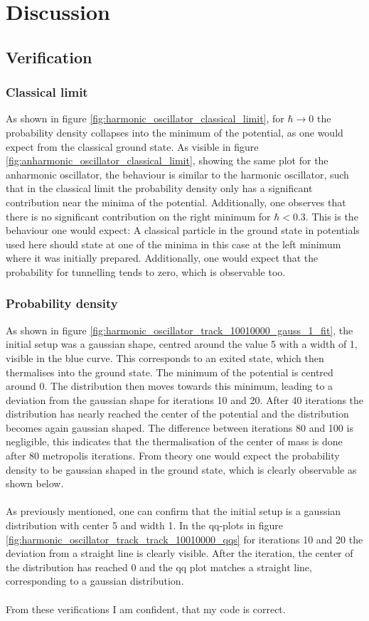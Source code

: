 \documentclass{scrartcl}
\begin{document}
	\section{Discussion}
	\subsection{Verification}
	\subsubsection{Classical limit}
		As shown in figure \ref{fig:harmonic_oscillator_classical_limit}, for $\hbar \rightarrow 0$ the probability density collapses into the minimum of the potential, as one would expect from the classical ground state.
		As visible in figure \ref{fig:anharmonic_oscillator_classical_limit}, showing the same plot for the anharmonic oscillator, the behaviour is similar to the harmonic oscillator, such that in the classical limit the probability density only has a significant contribution near the minima of the potential.
		Additionally, one observes that there is no significant contribution on the right minimum for $\hbar < 0.3$.
		This is the behaviour one would expect:
		A classical particle in the ground state in potentials used here should state at one of the minima in this case at the left minimum where it was initially prepared.
		Additionally, one would expect that the probability for tunnelling tends to zero, which is observable too.

	\subsubsection{Probability density}
		As shown in figure \ref{fig:harmonic_oscillator_track_10010000_gauss_1_fit}, the initial setup was a gaussian shape, centred around the value 5 with a width of 1, visible in the blue curve.
		This corresponds to an exited state, which then thermalises into the ground state.
		The minimum of the potential is centred around 0.
		The distribution then moves towards this minimum, leading to a deviation from the gaussian shape for iterations 10 and 20.
		After 40 iterations the distribution has nearly reached the center of the potential and the distribution becomes again gaussian shaped.
		The difference between iterations 80 and 100 is negligible, this indicates that the thermalisation of the center of mass is done after 80 metropolis iterations.
		From theory one would expect the probability density to be gaussian shaped in the ground state, which is clearly observable as shown below.
		\\\\
		As previously mentioned, one can confirm that the initial setup is a gaussian distribution with center 5 and width 1.
		In the qq-plots in figure \ref{fig:harmonic_oscillator_track_track_10010000_qqs} for iterations 10 and 20 the deviation from a straight line is clearly visible.
		After the  iteration, the center of the distribution has reached 0 and the qq plot matches a straight line, corresponding to a gaussian distribution.
		\\\\
		From these verifications I am confident, that my code is correct.
\end{document}
